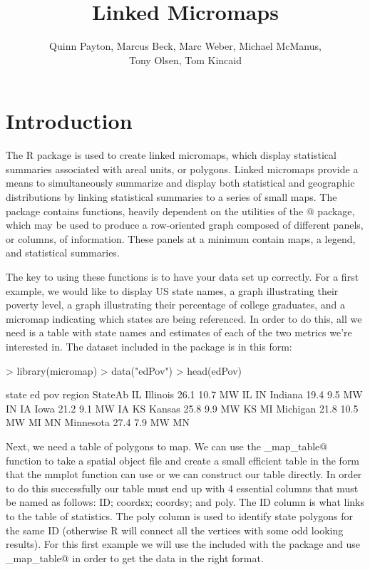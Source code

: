 \documentclass{article}
\newcommand{\R}{{\normalfont\textsf{R }}{}}
\begin{document}


\title{Linked Micromaps}

\author{Quinn Payton, Marcus Beck, Marc Weber, Michael McManus,\\Tony Olsen, Tom Kincaid}

\maketitle

\section{Introduction}
The \R package \verb@micromap@ is used to create linked micromaps, which display statistical summaries associated with areal units, or polygons. Linked micromaps provide a means to simultaneously summarize and display both statistical and geographic distributions by linking statistical summaries to a series of small maps. The package contains functions, heavily dependent on the utilities of the @ package, which may be used to produce a row-oriented graph composed of different panels, or columns, of information. These panels at a minimum contain maps, a legend, and statistical summaries.

The key to using these functions is to have your data set up correctly. For a first example, we would like to display US state names, a graph illustrating their poverty level, a graph illustrating their percentage of college graduates, and a micromap indicating which states are being referenced. In order to do this, all we need is a table with state names and estimates of each of the two metrics we're interested in. The dataset \verb@edpov@ included in the \verb@micromap@ package is in this form:

\begin{Schunk}
\begin{Sinput}
> library(micromap)
> data("edPov") 
> head(edPov)
\end{Sinput}
\begin{Soutput}
       state   ed  pov region StateAb
IL  Illinois 26.1 10.7     MW      IL
IN   Indiana 19.4  9.5     MW      IN
IA      Iowa 21.2  9.1     MW      IA
KS    Kansas 25.8  9.9     MW      KS
MI  Michigan 21.8 10.5     MW      MI
MN Minnesota 27.4  7.9     MW      MN
\end{Soutput}
\end{Schunk}

Next, we need a table of polygons to map. We can use the \verb@create_map_table@ function to take a spatial object file and create a small efficient table in the form that the mmplot function can use or we can construct our table directly.  In order to do this successfully our table must end up with 4 essential columns that must be named as follows:  ID; coordsx; coordsy; and poly. The ID column is what links to the table of statistics. The poly column is used to identify state polygons for the same ID (otherwise R will connect all the vertices with some odd looking results). For this first example we will use the \verb@USstates@ included with the package and use \verb@create_map_table@ in order to get the data in the right format. 
\end{document}
